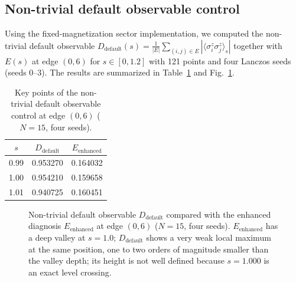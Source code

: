 \documentclass[aps,prb,reprint,superscriptaddress]{revtex4-2}
\begin{document}
\subsection{Non-trivial default observable control}
\label{sec:default_control}

Using the fixed-magnetization sector implementation, we computed the non-trivial default observable $D_{\text{default}}(s)=\frac{1}{|E|}\sum_{(i,j)\in E}|\langle\sigma_i^z\sigma_j^z\rangle_s|$ together with $E(s)$ at edge $(0,6)$ for $s\in[0,1.2]$ with 121 points and four Lanczos seeds (seeds 0--3). The results are summarized in Table~\ref{tab:default_control} and Fig.~\ref{fig:default_control}.

\begin{table}[h]
\centering
\caption{Key points of the non-trivial default observable control at edge $(0,6)$ ($N=15$, four seeds).}
\label{tab:default_control}
\begin{tabular}{ccc}
\toprule
$s$ & $D_{\text{default}}$ & $E_{\text{enhanced}}$ \\
\midrule
0.99 & 0.953270 & 0.164032 \\
1.00 & 0.954210 & 0.159658 \\
1.01 & 0.940725 & 0.160451 \\
\bottomrule
\end{tabular}
\end{table}

\begin{figure}[t]
\centering
{}
\caption{Non-trivial default observable $D_{\text{default}}$ compared with the enhanced diagnosis $E_{\text{enhanced}}$ at edge $(0,6)$ ($N=15$, four seeds). $E_{\text{enhanced}}$ has a deep valley at $s=1.0$; $D_{\text{default}}$ shows a very weak local maximum at the same position, one to two orders of magnitude smaller than the valley depth; its height is not well defined because $s=1.000$ is an exact level crossing.}
\label{fig:default_control}
\end{figure}
\end{document}
